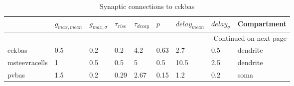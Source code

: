 \begin{longtable}{lllllllll}
\caption{Synaptic connections to cckbas}\label{cckbas_synapses}\\
\toprule
{} & $g_{max, mean}$ & $g_{max, \sigma}$ & $\tau_{rise}$ & $\tau_{decay}$ &  $p$ & $delay_{mean}$ & $delay_{\sigma}$ & Compartment \\
\midrule
\endhead
\midrule
\multicolumn{9}{r}{{Continued on next page}} \\
\midrule
\endfoot

\bottomrule
\endlastfoot
cckbas        &  0.5 &      0.2 &      0.2 &       4.2 &  0.63 &   2.7 &       0.5 &      dendrite\ \\
msteevracells &    1 &      0.5 &      0.5 &         5 &   0.5 &  10.5 &       2.5 &      dendrite\ \\
pvbas         &  1.5 &      0.2 &     0.29 &      2.67 &  0.15 &   1.2 &       0.2 &               soma \\
\end{longtable}
